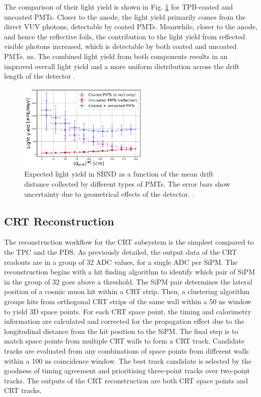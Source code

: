 The comparison of their light yield is shown in Fig. \ref{fig:light_yield_Diego} for TPB-coated and uncoated PMTs.
Closer to the anode, the light yield primarily comes from the direct VUV photons, detectable by coated PMTs.
Meanwhile, closer to the anode, and hence the reflective foils, the contribution to the light yield from reflected visible photons increased, which is detectable by both coated and uncoated PMTs.
ns.
The combined light yield from both components results in an improved overall light yield and a more uniform distribution across the drift length of the detector \cite{light_yield_Diego}.

\begin{figure}[htbp]
\centering    
\includegraphics[width=0.55\textwidth]{light_yield_sim}
\caption[Simulated Light Yield at SBND]{
Expected light yield in SBND as a function of the mean drift distance collected by different types of PMTs.
The error bars show uncertainty due to geometrical effects of the detector.
\cite{sbnd_pds_paper}.
}
\label{fig:light_yield_Diego}
\end{figure}
\subsection{CRT Reconstruction}

The reconstruction workflow for the CRT subsystem is the simplest compared to the TPC and the PDS.                                                                                                    
As previously detailed, the output data of the CRT readouts are in a group of 32 ADC values, for a single ADC per SiPM.
The reconstruction begins with a hit finding algorithm to identify which pair of SiPM in the group of 32 goes above a threshold.
The SiPM pair determines the lateral position of a cosmic muon hit within a CRT strip.
Then, a clustering algorithm groups hits from orthogonal CRT strips of the same wall within a 50 ns window to yield 3D space points.
For each CRT space point, the timing and calorimetry information are calculated and corrected for the propagation effect due to the longitudinal distance from the hit position to the SiPM.
The final step is to match space points from multiple CRT walls to form a CRT track.
Candidate tracks are evaluated from any combinations of space points from different walls within a 100 ns coincidence window.
The best track candidate is selected by the goodness of timing agreement and prioritising three-point tracks over two-point tracks. 
The outputs of the CRT reconstruction are both CRT space points and CRT tracks. 

